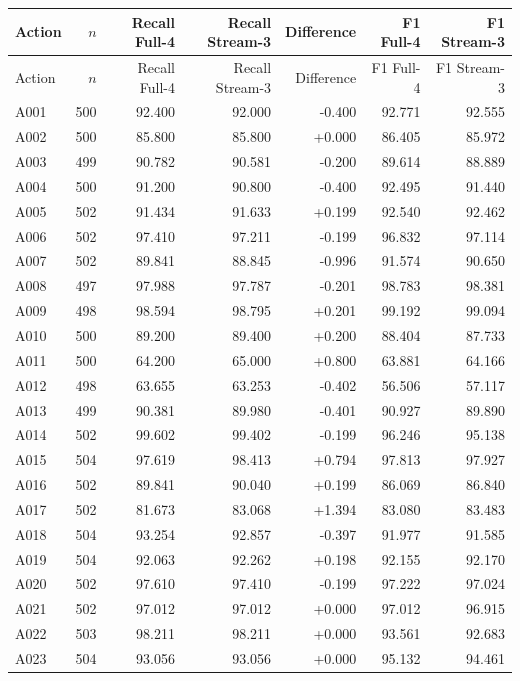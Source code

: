 \begin{longtable}{lrrrrrr}
\toprule
Action & $n$ & Recall Full-4 & Recall Stream-3 & Difference & F1 Full-4 & F1 Stream-3 \\
\midrule
\endfirsthead
\toprule
Action & $n$ & Recall Full-4 & Recall Stream-3 & Difference & F1 Full-4 & F1 Stream-3 \\
\midrule
\endhead
A001 & 500 & 92.400 & 92.000 & -0.400 & 92.771 & 92.555 \\
A002 & 500 & 85.800 & 85.800 & +0.000 & 86.405 & 85.972 \\
A003 & 499 & 90.782 & 90.581 & -0.200 & 89.614 & 88.889 \\
A004 & 500 & 91.200 & 90.800 & -0.400 & 92.495 & 91.440 \\
A005 & 502 & 91.434 & 91.633 & +0.199 & 92.540 & 92.462 \\
A006 & 502 & 97.410 & 97.211 & -0.199 & 96.832 & 97.114 \\
A007 & 502 & 89.841 & 88.845 & -0.996 & 91.574 & 90.650 \\
A008 & 497 & 97.988 & 97.787 & -0.201 & 98.783 & 98.381 \\
A009 & 498 & 98.594 & 98.795 & +0.201 & 99.192 & 99.094 \\
A010 & 500 & 89.200 & 89.400 & +0.200 & 88.404 & 87.733 \\
A011 & 500 & 64.200 & 65.000 & +0.800 & 63.881 & 64.166 \\
A012 & 498 & 63.655 & 63.253 & -0.402 & 56.506 & 57.117 \\
A013 & 499 & 90.381 & 89.980 & -0.401 & 90.927 & 89.890 \\
A014 & 502 & 99.602 & 99.402 & -0.199 & 96.246 & 95.138 \\
A015 & 504 & 97.619 & 98.413 & +0.794 & 97.813 & 97.927 \\
A016 & 502 & 89.841 & 90.040 & +0.199 & 86.069 & 86.840 \\
A017 & 502 & 81.673 & 83.068 & +1.394 & 83.080 & 83.483 \\
A018 & 504 & 93.254 & 92.857 & -0.397 & 91.977 & 91.585 \\
A019 & 504 & 92.063 & 92.262 & +0.198 & 92.155 & 92.170 \\
A020 & 502 & 97.610 & 97.410 & -0.199 & 97.222 & 97.024 \\
A021 & 502 & 97.012 & 97.012 & +0.000 & 97.012 & 96.915 \\
A022 & 503 & 98.211 & 98.211 & +0.000 & 93.561 & 92.683 \\
A023 & 504 & 93.056 & 93.056 & +0.000 & 95.132 & 94.461 \\

\end{longtable}
